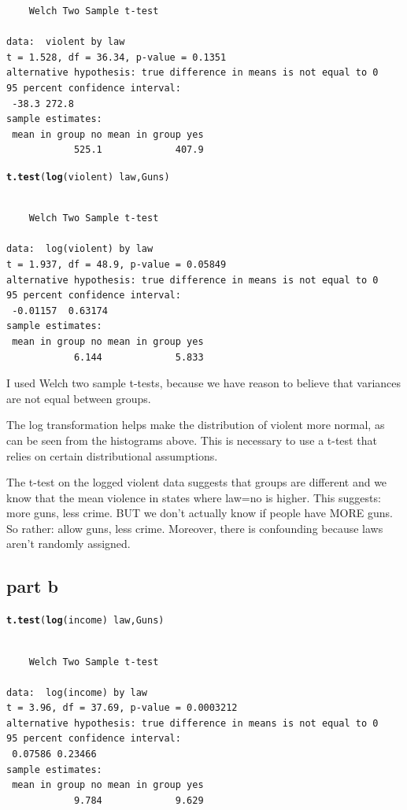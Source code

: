 \documentclass{article}\usepackage{graphicx, color}
\makeatletter
\newcommand{\hlfunctioncall}[1]{\textcolor[rgb]{0.501960784313725,0,0.329411764705882}{\textbf{#1}}}%
\newenvironment{kframe}{%
 \def\at@end@of@kframe{}%
 \ifinner\ifhmode%
  \def\at@end@of@kframe{\end{minipage}}%
  \begin{minipage}{\columnwidth}%
 \fi\fi%
 \def\FrameCommand##1{\hskip\@totalleftmargin \hskip-\fboxsep
 \colorbox{shadecolor}{##1}\hskip-\fboxsep
     \hskip-\linewidth \hskip-\@totalleftmargin \hskip\columnwidth}%
 \MakeFramed {\advance\hsize-\width
   \@totalleftmargin\z@ \linewidth\hsize
   \@setminipage}}%
 {\par\unskip\endMakeFramed%
 \at@end@of@kframe}
\newenvironment{knitrout}{}{} %
\makeatother
\begin{document}
\begin{knitrout}
\begin{kframe}
\begin{verbatim}
	Welch Two Sample t-test

data:  violent by law 
t = 1.528, df = 36.34, p-value = 0.1351
alternative hypothesis: true difference in means is not equal to 0 
95 percent confidence interval:
 -38.3 272.8 
sample estimates:
 mean in group no mean in group yes 
            525.1             407.9 

\end{verbatim}
\begin{alltt}
\hlfunctioncall{t.test}(\hlfunctioncall{log}(violent)~law, Guns)
\end{alltt}
\begin{verbatim}

	Welch Two Sample t-test

data:  log(violent) by law 
t = 1.937, df = 48.9, p-value = 0.05849
alternative hypothesis: true difference in means is not equal to 0 
95 percent confidence interval:
 -0.01157  0.63174 
sample estimates:
 mean in group no mean in group yes 
            6.144             5.833 

\end{verbatim}
\end{kframe}
\end{knitrout}


I used Welch two sample t-tests, because we have reason to believe that variances are not equal between groups.

The log transformation helps make the distribution of violent more normal, as can be seen from the histograms above. This is necessary to use a t-test that relies on certain distributional assumptions.

The t-test on the logged violent data suggests that groups are different and we know that the mean violence in states where law=no is higher. This suggests: more guns, less crime. BUT we don't actually know if people have MORE guns. So rather: allow guns, less crime. Moreover, there is confounding because laws aren't randomly assigned.

\subsection*{part b}
\begin{knitrout}
\color{fgcolor}\begin{kframe}
\begin{alltt}
\hlfunctioncall{t.test}(\hlfunctioncall{log}(income)~law, Guns)
\end{alltt}
\begin{verbatim}

	Welch Two Sample t-test

data:  log(income) by law 
t = 3.96, df = 37.69, p-value = 0.0003212
alternative hypothesis: true difference in means is not equal to 0 
95 percent confidence interval:
 0.07586 0.23466 
sample estimates:
 mean in group no mean in group yes 
            9.784             9.629 

\end{verbatim}
\end{kframe}
\end{knitrout}
\end{document}
